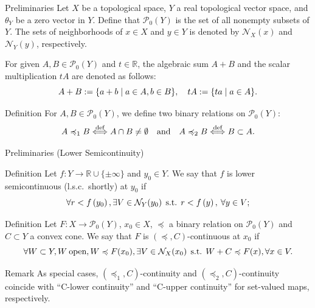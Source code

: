 \documentclass[aspectratio=169, dvipdfmx, 11pt]{beamer}
\newcommand{\RealNumberSet}{\mathbb{R}}
\newcommand{\Nbd}[2]{\mbox{$\mathcal{N}_{#1}({#2})$}}
\newcommand{\pow}[1]{\mathcal{P}_{0}(#1)}
\newcommand{\SuchThat}{\:\text{s.t.}\:}
\begin{document}
\begin{frame}{Preliminaries}
  Let $X$ be a topological space, $Y$ a real topological vector space, and $\theta_Y$ be a zero vector in $Y$.
  Define that $\pow{Y}$ is the set of all nonempty subsets of $Y$.
  The sets of neighborhoods of $x \in X$ and $y \in Y$ is denoted by $\mathcal{N}_X (x)$ and $\mathcal{N}_Y (y)$, respectively.

  For given $A,B\in\pow{Y}$ and $t\in\RealNumberSet$,
  the algebraic sum $A+B$ and the scalar multiplication $tA$ are denoted as follows:
  \begin{equation}
    A+B:= \{a+b \mid a\in{A},b\in{B} \}, \quad tA:= \{ta\mid a\in{A}\}. \notag
  \end{equation}
  \begin{block}{Definition}
    For $A,B \in \pow{Y}$, we define two binary relations on $\pow{Y}$:
    \begin{equation}
      A \preccurlyeq_1 B \overset{\text{def}}{\Longleftrightarrow} A \cap B \ne \emptyset \quad \text{and} \quad A \preccurlyeq_2 B \overset{\text{def}}{\Longleftrightarrow} B \subset A. \notag
    \end{equation}
  \end{block}
\end{frame}

\begin{frame}{Preliminaries (Lower Semicontinuity)}
  \begin{block}{Definition}
    Let $f:Y\rightarrow \RealNumberSet \cup \{ \pm \infty\}$ and $y_{0}\in{Y}$.
    We say that $f$ is
    lower semicontinuous (l.s.c.\ shortly) at $y_{0}$ if
    \begin{equation}
      \forall r < f \left( y_{0} \right),
      \exists V \in \Nbd{Y}{y_{0}} \:\SuchThat\: r < f \left( y \right),\: \forall y \in V; \notag
    \end{equation}
  \end{block}

  \begin{block}{Definition \cite{500001551932}}
    Let $F \colon X \to \pow{Y}$, $x_0 \in X$, $\preccurlyeq$ a binary relation on $\pow{Y}$
    and $C \subset Y$ a convex cone. We say that $F$ is $(\preccurlyeq, C)$-continuous at $x_0$ if
    \begin{equation}
      \forall W \subset Y, W\:\text{open},W \preccurlyeq F(x_0), \exists V \in \mathcal{N}_{X}(x_0) \:\SuchThat\: W + C \preccurlyeq F(x), \forall x \in V. \notag
    \end{equation}
  \end{block}

  \begin{alertblock}{Remark}
    As special cases, $(\preccurlyeq_1, C)$-continuity and $(\preccurlyeq_2, C)$-continuity coincide with “C-lower
    continuity” and “C-upper continuity” for set-valued maps, respectively.
  \end{alertblock}
\end{frame}
\end{document}
